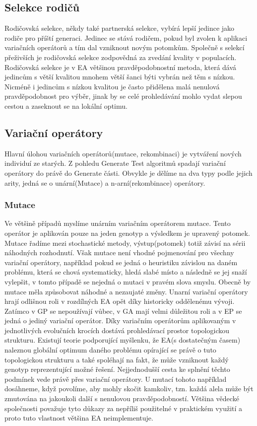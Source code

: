 \subsection{Selekce rodičů}
Rodičovská selekce, někdy také partnerská selekce, vybírá lepší jedince jako rodiče pro příští generaci. Jedinec se stává rodičem, pokud byl zvolen k aplikaci variačních operátorů a tím dal vzniknout novým potomkům. Společně s selekcí přeživších je rodičovská selekce zodpovědná za zvedání kvality v populacích. Rodičovská selekce je v EA většinou pravděpodobnostní metoda, která dává jedincům s větší kvalitou mnohem větší šanci býti vybrán než těm s nízkou. Nicméně i jedincům s nízkou kvalitou je často přidělena malá nenulová pravděpodobnost pro výběr, jinak by se celé prohledávání mohlo vydat slepou cestou a zaseknout se na lokální optimu. 
\subsection{Variační operátory}
Hlavní úlohou variačních operátorů(mutace, rekombinaci) je vytváření nových individuí ze starých. Z pohledu Generate  Test algoritmů spadají variační operátory do právě do Generate části. Obvykle je dělíme na dva typy podle jejich arity, jedná se o unární(Mutace) a n-arní(rekombinace) operátory.
\subsubsection{Mutace}
Ve většině případů myslíme unárním variačním operátorem mutace. Tento operátor je aplikován pouze na jeden genotyp a výsledkem je upravený potomek. Mutace řadíme mezi stochastické metody, výstup(potomek) totiž závisí na sérii náhodných rozhodnutí. Však mutace není vhodné pojmenování pro všechny variační operátory, například pokud se jedná o heuristiku závislou na daném problému, která se chová systematicky, hledá slabé místo a následně se jej snaží vylepšit, v tomto případě se nejedná o mutaci v pravém slova smyslu. Obecně by mutace měla způsobovat náhodné a nezaujaté změny. Unarní variační operátory hrají odlišnou roli v rozdílných EA opět díky historicky oddělenému vývoji. Zatímco v GP se nepoužívají vůbec, v GA mají velmi důležitou roli a v EP se jedná o jediný variační operátor. Díky variačním operátorům aplikovaným v jednotlivých evolučních krocích dostává prohledávací prostor topologickou strukturu. Existují teorie podporující myšlenku, že EA(s dostatečným časem) naleznou globální optimum daného problému opírající se právě o tuto topologickou strukturu a také spoléhají na fakt, že může vzniknout každý genotyp reprezentující možné řešení. Nejjednodušší cesta ke splnění těchto podmínek vede právě přes variační operátory. U mutací tohoto například dosáhneme, když povolíme, aby mohly skočit kamkoliv, tzn. každá alela může být zmutována na jakoukoli další s nenulovou pravděpodobností. Většina vědecké společnosti považuje tyto důkazy za nepříliš použitelné v praktickém využití a proto tuto vlastnost většina EA neimplementuje.  
